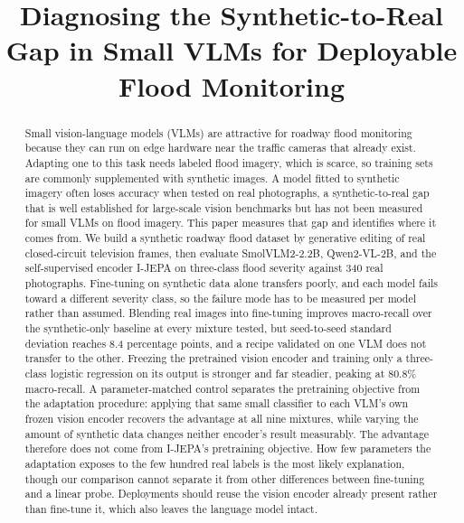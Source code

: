 \documentclass[conference]{IEEEtran}
\begin{document}
\title{Diagnosing the Synthetic-to-Real Gap in Small VLMs for Deployable Flood Monitoring}

\author{
\and
{}
\and
{}
}

\maketitle

\begin{abstract}
Small vision-language models (VLMs) are attractive for roadway flood monitoring because they can run on edge hardware near the traffic cameras that already exist. Adapting one to this task needs labeled flood imagery, which is scarce, so training sets are commonly supplemented with synthetic images. A model fitted to synthetic imagery often loses accuracy when tested on real photographs, a synthetic-to-real gap that is well established for large-scale vision benchmarks but has not been measured for small VLMs on flood imagery. This paper measures that gap and identifies where it comes from. We build a synthetic roadway flood dataset by generative editing of real closed-circuit television frames, then evaluate SmolVLM2-2.2B, Qwen2-VL-2B, and the self-supervised encoder I-JEPA on three-class flood severity against 340 real photographs. Fine-tuning on synthetic data alone transfers poorly, and each model fails toward a different severity class, so the failure mode has to be measured per model rather than assumed. Blending real images into fine-tuning improves macro-recall over the synthetic-only baseline at every mixture tested, but seed-to-seed standard deviation reaches 8.4 percentage points, and a recipe validated on one VLM does not transfer to the other. Freezing the pretrained vision encoder and training only a three-class logistic regression on its output is stronger and far steadier, peaking at 80.8\% macro-recall. A parameter-matched control separates the pretraining objective from the adaptation procedure: applying that same small classifier to each VLM's own frozen vision encoder recovers the advantage at all nine mixtures, while varying the amount of synthetic data changes neither encoder's result measurably. The advantage therefore does not come from I-JEPA's pretraining objective. How few parameters the adaptation exposes to the few hundred real labels is the most likely explanation, though our comparison cannot separate it from other differences between fine-tuning and a linear probe. Deployments should reuse the vision encoder already present rather than fine-tune it, which also leaves the language model intact.
\end{abstract}
\end{document}
